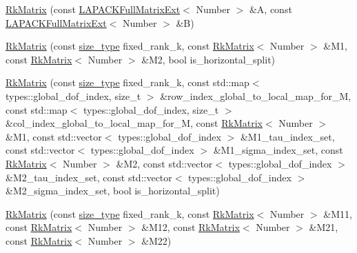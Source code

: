 \begin{DoxyCompactItemize}
\item 
\hyperlink{classRkMatrix_a22cbf825bdbff58434ab3d4a6c478b96}{Rk\+Matrix} (const \hyperlink{classLAPACKFullMatrixExt}{L\+A\+P\+A\+C\+K\+Full\+Matrix\+Ext}$<$ Number $>$ \&A, const \hyperlink{classLAPACKFullMatrixExt}{L\+A\+P\+A\+C\+K\+Full\+Matrix\+Ext}$<$ Number $>$ \&B)
\item 
\hyperlink{classRkMatrix_ae15a15d55d04dd677a8dc90dbf789674}{Rk\+Matrix} (const \hyperlink{classRkMatrix_add060bfc3a4cc77f858c3d6dd58cadd5}{size\+\_\+type} fixed\+\_\+rank\+\_\+k, const \hyperlink{classRkMatrix}{Rk\+Matrix}$<$ Number $>$ \&M1, const \hyperlink{classRkMatrix}{Rk\+Matrix}$<$ Number $>$ \&M2, bool is\+\_\+horizontal\+\_\+split)
\item 
\hyperlink{classRkMatrix_a0ef50f2d8d07bcbffa0a6d015dc0d1a4}{Rk\+Matrix} (const \hyperlink{classRkMatrix_add060bfc3a4cc77f858c3d6dd58cadd5}{size\+\_\+type} fixed\+\_\+rank\+\_\+k, const std\+::map$<$ types\+::global\+\_\+dof\+\_\+index, size\+\_\+t $>$ \&row\+\_\+index\+\_\+global\+\_\+to\+\_\+local\+\_\+map\+\_\+for\+\_\+M, const std\+::map$<$ types\+::global\+\_\+dof\+\_\+index, size\+\_\+t $>$ \&col\+\_\+index\+\_\+global\+\_\+to\+\_\+local\+\_\+map\+\_\+for\+\_\+M, const \hyperlink{classRkMatrix}{Rk\+Matrix}$<$ Number $>$ \&M1, const std\+::vector$<$ types\+::global\+\_\+dof\+\_\+index $>$ \&M1\+\_\+tau\+\_\+index\+\_\+set, const std\+::vector$<$ types\+::global\+\_\+dof\+\_\+index $>$ \&M1\+\_\+sigma\+\_\+index\+\_\+set, const \hyperlink{classRkMatrix}{Rk\+Matrix}$<$ Number $>$ \&M2, const std\+::vector$<$ types\+::global\+\_\+dof\+\_\+index $>$ \&M2\+\_\+tau\+\_\+index\+\_\+set, const std\+::vector$<$ types\+::global\+\_\+dof\+\_\+index $>$ \&M2\+\_\+sigma\+\_\+index\+\_\+set, bool is\+\_\+horizontal\+\_\+split)
\item 
\hyperlink{classRkMatrix_acefd088fc714d99b701a553713c405ce}{Rk\+Matrix} (const \hyperlink{classRkMatrix_add060bfc3a4cc77f858c3d6dd58cadd5}{size\+\_\+type} fixed\+\_\+rank\+\_\+k, const \hyperlink{classRkMatrix}{Rk\+Matrix}$<$ Number $>$ \&M11, const \hyperlink{classRkMatrix}{Rk\+Matrix}$<$ Number $>$ \&M12, const \hyperlink{classRkMatrix}{Rk\+Matrix}$<$ Number $>$ \&M21, const \hyperlink{classRkMatrix}{Rk\+Matrix}$<$ Number $>$ \&M22)
\item 

\end{DoxyCompactItemize}
